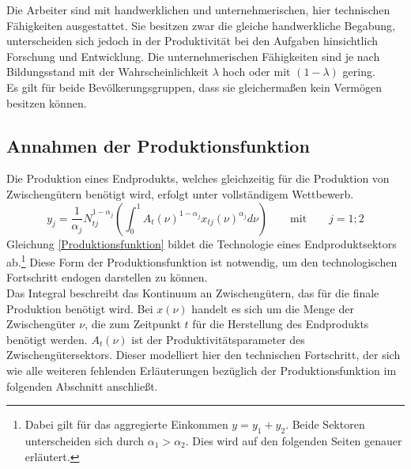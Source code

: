 Die Arbeiter sind mit handwerklichen und unternehmerischen, hier technischen Fähigkeiten ausgestattet. Sie besitzen zwar die gleiche handwerkliche Begabung, unterscheiden sich jedoch in der Produktivität bei den Aufgaben hinsichtlich Forschung und Entwicklung. Die unternehmerischen Fähigkeiten sind je nach Bildungsstand mit der Wahrscheinlichkeit $\lambda$ hoch oder mit $(1-\lambda)$ gering.\\


Es gilt für beide Bevölkerungsgruppen, dass sie gleicherma{\ss}en kein Vermögen besitzen können.



\subsection{Annahmen der Produktionsfunktion}\label{sec:Annahmen der Produktionsfunktion}
Die Produktion eines Endprodukts, welches gleichzeitig für die Produktion von Zwischengütern benötigt wird, erfolgt unter vollständigem Wettbewerb. 
\begin{equation}y_j=\frac{1}{\alpha_j}N_{tj}^{1-\alpha_j}\left(\int_0^1{A_t(\nu)^{1-\alpha_j}x_{tj}(\nu)^{\alpha_j}}d\nu\right)\label{Produktionsfunktion} \qquad \text{mit} \qquad  j= 1;2\end{equation} 
Gleichung \eqref{Produktionsfunktion} bildet die Technologie eines Endproduktsektors ab.\footnote{Dabei gilt für das aggregierte Einkommen $y=y_1+y_{2}$. Beide Sektoren unterscheiden sich durch $\alpha_1>\alpha_{2}$. Dies wird auf den folgenden Seiten genauer erläutert.} Diese Form der Produktionsfunktion ist notwendig, um den technologischen Fortschritt endogen darstellen zu können.\\


Das Integral beschreibt das Kontinuum an Zwischengütern, das für die finale Produktion benötigt wird. Bei $x(\nu)$ handelt es sich um die Menge der Zwischengüter $\nu$, die zum Zeitpunkt $t$ für die Herstellung des Endprodukts benötigt werden. $A_t(\nu)$ ist der Produktivitätsparameter des Zwischengütersektors. Dieser modelliert hier den technischen Fortschritt, der sich wie alle weiteren fehlenden Erläuterungen bezüglich der Produktionsfunktion im folgenden Abschnitt anschlie{\ss}t.



